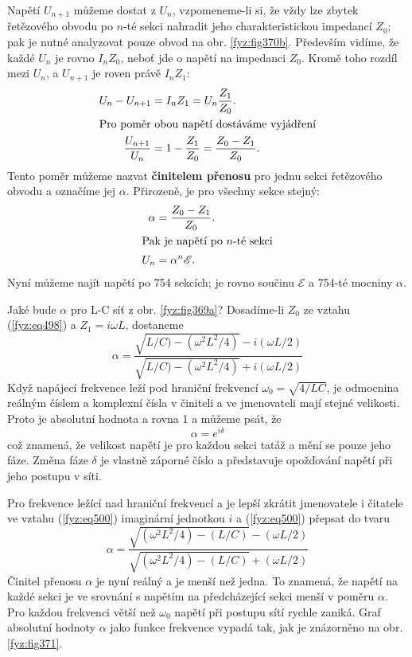   Napětí \(U_{n+1}\) můžeme dostat z \(U_n\), vzpomeneme-li si, že vždy lze zbytek řetězového 
  obvodu po \(n\)-té sekci nahradit jeho charakteristickou impedancí \(Z_0\); pak je nutné 
  analyzovat pouze obvod na obr. \ref{fyz:fig370b}. Především vidíme, že každé \(U_n\) je rovno 
  \(I_nZ_0\), neboť jde o napětí na impedanci \(Z_0\). Kromě toho rozdíl mezi \(U_n\), a 
  \(U_{n+1}\) je roven právě \(I_nZ_1\):
  \begin{align*}
    U_n - U_{n+1}       &= I_nZ_1 = U_n\frac{Z_1}{Z_0}.  \\
    \shortintertext{Pro poměr obou napětí dostáváme vyjádření} 
    \frac{U_{n+1}}{U_n} &= 1 - \frac{Z_1}{Z_0} = \frac{Z_0 -Z_1}{Z_0}.
  \end{align*}
  Tento poměr můžeme nazvat \textbf{činitelem přenosu} pro jednu sekci řetězového obvodu a označíme 
  jej \(\alpha\). Přirozeně, je pro všechny sekce stejný: 
  \begin{align*}
    \alpha  &= \frac{Z_0 -Z_1}{Z_0}.  \\
    \shortintertext{Pak je napětí po \(n\)-té sekci} 
    U_n     &= \alpha^n\mathscr{E}.
  \end{align*}
  Nyní můžeme najít napětí po \num{754} sekcích; je rovno součinu \(\mathscr{E}\) a \num{754}-té 
  mocniny \(\alpha\). 
  
  Jaké bude \(\alpha\) pro L-C síť z obr. \ref{fyz:fig369a}? Dosadíme-li \(Z_0\) ze vztahu 
  (\ref{fyz:eq498}) a \(Z_1 =i\omega L\), dostaneme
  \begin{equation}\label{fyz:eq500}
    \alpha = \dfrac{\sqrt{L/C) - (\omega^2L^2/4)} - i(\omega L/2)}
                   {\sqrt{L/C) - (\omega^2L^2/4)} + i(\omega L/2)}
  \end{equation}
  Když napájecí frekvence leží pod hraniční frekvencí \(\omega_0 =\sqrt{4/LC}\), je odmocnina 
  reálným číslem a komplexní čísla v činiteli a ve jmenovateli mají stejné velikosti. Proto je 
  absolutní hodnota a rovna 1 a můžeme psát, že
  \begin{equation*}
    \alpha = e^{i\delta}
  \end{equation*}
  což znamená, že velikost napětí je pro každou sekci tatáž a mění se pouze jeho fáze. Změna fáze 
  \(\delta\) je vlastně záporné číslo a představuje opožďování napětí při jeho postupu v síti. 
  
  Pro frekvence ležící nad hraniční frekvencí a je lepší zkrátit jmenovatele i čitatele ve vztahu 
  (\ref{fyz:eq500}) imaginární jednotkou \(i\) a (\ref{fyz:eq500}) přepsat do tvaru
  \begin{equation}\label{fyz:eq501}
    \alpha = \dfrac{\sqrt{(\omega^2L^2/4) - (L/C)} - (\omega L/2)}
                   {\sqrt{(\omega^2L^2/4) - (L/C)} + (\omega L/2)}
  \end{equation}
  Činitel přenosu \(\alpha\) je nyní reálný a je menší než jedna. To znamená, že napětí na každé 
  sekci je ve srovnání s napětím na předcházející sekci menší v poměru \(\alpha\). Pro každou 
  frekvenci větší než \(\omega_0\) napětí při postupu sítí rychle zaniká. Graf absolutní hodnoty 
  \(\alpha\) jako funkce frekvence vypadá tak, jak je znázorněno na obr. \ref{fyz:fig371}. 
  
